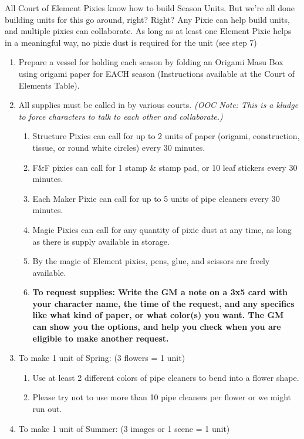 \documentclass[green]{PP}
\begin{document}
\name{\gSesons{}}

All Court of Element Pixies know how to build Season Units. But we’re all done building units for this go around, right? Right? Any Pixie can help build units, and multiple pixies can collaborate. As long as at least one Element Pixie helps in a meaningful way, no pixie dust is required for the unit (see step 7)

\begin{enumerate}
	\item Prepare a vessel for holding each season by folding an Origami Masu Box using origami paper for EACH season (Instructions available at the Court of Elements Table).
	\item All supplies must be called in by various courts. \textit{(OOC Note: This is a kludge to force characters to talk to each other and collaborate.)}
	\begin{enumerate}
		\item Structure Pixies can call for up to 2 units of paper (origami, construction, tissue, or round white circles) every 30 minutes.
		\item F\&F pixies can call for 1 stamp \& stamp pad, or 10 leaf stickers every 30 minutes.
		\item Each Maker Pixie can call for up to 5 units of pipe cleaners every 30 minutes.
		\item Magic Pixies can call for any quantity of pixie dust at any time, as long as there is supply available in storage.
		\item By the magic of Element pixies, pens, glue, and scissors are freely available.
		\item \textbf{To request supplies: Write the GM a note on a 3x5 card with your character name, the time of the request, and any specifics like what kind of paper, or what color(s) you want. The GM can show you the options, and help you check when you are eligible to make another request.}
	\end{enumerate}
	\item To make 1 unit of Spring: (3 flowers = 1 unit)
	\begin{enumerate}
		\item Use at least 2 different colors of pipe cleaners to bend into a flower shape.
		\item Please try not to use more than 10 pipe cleaners per flower or we might run out.
	\end{enumerate}
	\item To make 1 unit of Summer: (3 images or 1 scene = 1 unit)

\end{enumerate}
\end{document}
